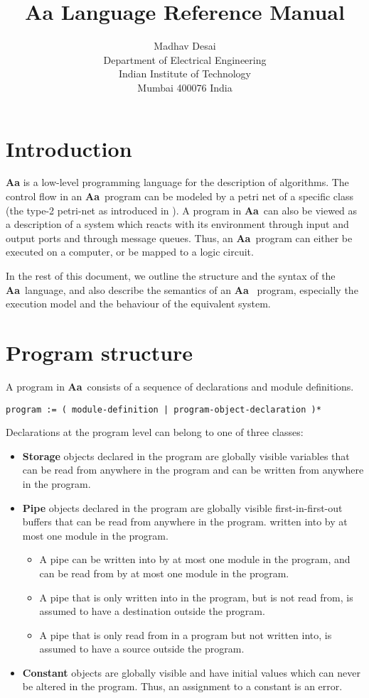 \documentclass{article}
\title{Aa Language Reference Manual}
\author{Madhav Desai \\ Department of Electrical Engineering \\ Indian Institute of Technology \\
	Mumbai 400076 India}
\newcommand{\Aa}{{\bf Aa}~}
\begin{document}
\maketitle

\section{Introduction}

{\bf Aa} is a low-level 
programming language for the description
of algorithms.  The control flow in
an \Aa program 
can be modeled by a petri net
of a specific class (the type-2 petri-net as
introduced in \cite{ref:SameerPhD}).  
A program in \Aa can also be viewed as a 
description of a system which reacts with 
its environment through input and output ports and 
through message queues.  Thus, an \Aa program
can either be executed on a computer, or
be mapped to a logic circuit.

In the rest of this document, we outline the
structure and the syntax of the \Aa language,
and also describe the semantics of an \Aa
program, especially the execution model and
the behaviour of the equivalent system.


\section{Program structure}


A program in \Aa consists of a sequence of
declarations and module definitions.  
\begin{verbatim}
program := ( module-definition | program-object-declaration )*
\end{verbatim}
Declarations at the program level 
can belong to one of three classes:
\begin{itemize}
\item {\bf Storage} objects declared in the program
are globally visible variables that can be read from
anywhere in the program and can be written from anywhere
in the program.
\item {\bf Pipe} objects declared in the program are
globally visible first-in-first-out buffers that can 
be read from anywhere in the program. 
written into by at most one module in the program.
\begin{itemize}
\item A pipe can be written into by at most one module
in the program, and can be read from by at most one module
in the program.
\item A pipe that is only written into in the program, but
is not read from, is assumed to have a destination outside
the program.
\item A pipe that is only read from in a program but not
written into, is assumed to have a source outside the program.
\end{itemize}
\item {\bf Constant} objects are globally visible and have
initial values which can never be altered in the program.
Thus, an assignment to a constant is an error.
\end{itemize} 
\end{document}

